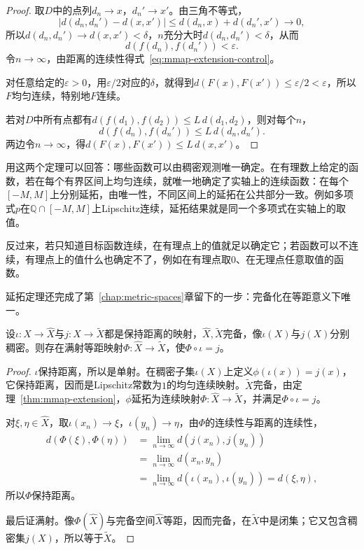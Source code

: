 \begin{proof}
取$D$中的点列$d_n\to x$，$d_n'\to x'$。由三角不等式，
\[
 \lvert d(d_n,d_n')-d(x,x')\rvert\leq d(d_n,x)+d(d_n',x')\to0,
\]
所以$d(d_n,d_n')\to d(x,x')<\delta$，$n$充分大时$d(d_n,d_n')<\delta$，从而
\[
 d(f(d_n),f(d_n'))<\varepsilon.
\]
令$n\to\infty$，由距离的连续性得式~\eqref{eq:mmap-extension-control}。

对任意给定的$\varepsilon>0$，用$\varepsilon/2$对应的$\delta$，就得到$d(F(x),F(x'))\leq\varepsilon/2<\varepsilon$，所以$F$均匀连续，特别地$F$连续。

若对$D$中所有点都有$d(f(d_1),f(d_2))\leq L\,d(d_1,d_2)$，则对每个$n$，
\[
 d(f(d_n),f(d_n'))\leq L\,d(d_n,d_n').
\]
两边令$n\to\infty$，得$d(F(x),F(x'))\leq L\,d(x,x')$。
\end{proof}

用这两个定理可以回答：哪些函数可以由稠密观测唯一确定。在有理数上给定的函数，若在每个有界区间上均匀连续，就唯一地确定了实轴上的连续函数：在每个$[-M,M]$上分别延拓，由唯一性，不同区间上的延拓在公共部分一致。例如多项式$p$在$\mathbb Q\cap[-M,M]$上Lipschitz连续，延拓结果就是同一个多项式在实轴上的取值。

反过来，若只知道目标函数连续，在有理点上的值就足以确定它；若函数可以不连续，有理点上的值什么也确定不了，例如在有理点取$0$、在无理点任意取值的函数。

延拓定理还完成了第~\ref{chap:metric-spaces}章留下的一步：完备化在等距意义下唯一。

\begin{theorem}[完备化的唯一性]
\label{thm:mmap-completion-unique}
设$\iota:X\to\hat X$与$j:X\to\tilde X$都是保持距离的映射，$\hat X,\tilde X$完备，像$\iota(X)$与$j(X)$分别稠密。则存在满射等距映射$\Phi:\hat X\to\tilde X$，使$\Phi\circ\iota=j$。
\end{theorem}

\begin{proof}
$\iota$保持距离，所以是单射。在稠密子集$\iota(X)$上定义$\phi(\iota(x))=j(x)$，它保持距离，因而是Lipschitz常数为$1$的均匀连续映射。$\tilde X$完备，由定理~\ref{thm:mmap-extension}，$\phi$延拓为连续映射$\Phi:\hat X\to\tilde X$，并满足$\Phi\circ\iota=j$。

对$\xi,\eta\in\hat X$，取$\iota(x_n)\to\xi$，$\iota(y_n)\to\eta$，由$\Phi$的连续性与距离的连续性，
\[
 \begin{aligned}
 d(\Phi(\xi),\Phi(\eta))&=\lim_{n\to\infty}d(j(x_n),j(y_n))\\
 &=\lim_{n\to\infty}d(x_n,y_n)\\
 &=\lim_{n\to\infty}d(\iota(x_n),\iota(y_n))=d(\xi,\eta),
 \end{aligned}
\]
所以$\Phi$保持距离。

最后证满射。像$\Phi(\hat X)$与完备空间$\hat X$等距，因而完备，在$\tilde X$中是闭集；它又包含稠密集$j(X)$，所以等于$\tilde X$。
\end{proof}
